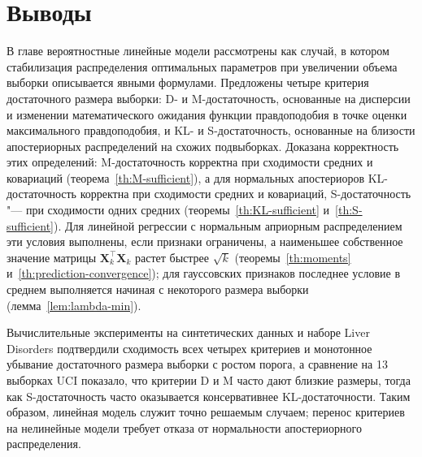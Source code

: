 \section{Выводы}

В главе вероятностные линейные модели рассмотрены как случай, в котором стабилизация распределения оптимальных параметров при увеличении объема выборки описывается явными формулами. Предложены четыре критерия достаточного размера выборки: D- и M-достаточность, основанные на дисперсии и изменении математического ожидания функции правдоподобия в точке оценки максимального правдоподобия, и KL- и S-достаточность, основанные на близости апостериорных распределений на схожих подвыборках. Доказана корректность этих определений: M-достаточность корректна при сходимости средних и ковариаций (теорема~\ref{th:M-sufficient}), а для нормальных апостериоров KL-достаточность корректна при сходимости средних и ковариаций, S-достаточность "--- при сходимости одних средних (теоремы~\ref{th:KL-sufficient} и~\ref{th:S-sufficient}). Для линейной регрессии с нормальным априорным распределением эти условия выполнены, если признаки ограничены, а наименьшее собственное значение матрицы $\mathbf X_k^\top\mathbf X_k$ растет быстрее $\sqrt k$ (теоремы~\ref{th:moments} и~\ref{th:prediction-convergence}); для гауссовских признаков последнее условие в среднем выполняется начиная с некоторого размера выборки (лемма~\ref{lem:lambda-min}).

Вычислительные эксперименты на синтетических данных и наборе Liver Disorders подтвердили сходимость всех четырех критериев и монотонное убывание достаточного размера выборки с ростом порога, а сравнение на 13 выборках UCI показало, что критерии D и M часто дают близкие размеры, тогда как S-достаточность часто оказывается консервативнее KL-достаточности. Таким образом, линейная модель служит точно решаемым случаем; перенос критериев на нелинейные модели требует отказа от нормальности апостериорного распределения.
